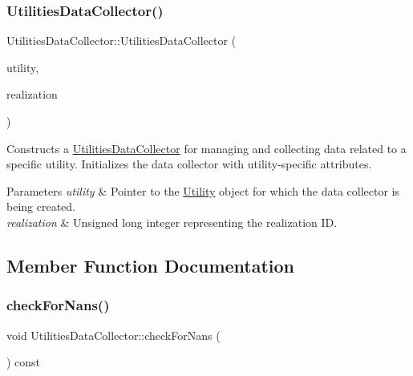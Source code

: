 \subsubsection{\texorpdfstring{Utilities\+Data\+Collector()}{UtilitiesDataCollector()}}
{\footnotesize\ttfamily Utilities\+Data\+Collector\+::\+Utilities\+Data\+Collector (\begin{DoxyParamCaption}\item[{const \mbox{\hyperlink{classUtility}{Utility}} $\ast$}]{utility,  }\item[{unsigned long}]{realization }\end{DoxyParamCaption})\hspace{0.3cm}{\ttfamily [explicit]}}



Constructs a {\ttfamily \mbox{\hyperlink{classUtilitiesDataCollector}{Utilities\+Data\+Collector}}} for managing and collecting data related to a specific utility. Initializes the data collector with utility-\/specific attributes. 


\begin{DoxyParams}{Parameters}
{\em utility} & Pointer to the {\ttfamily \mbox{\hyperlink{classUtility}{Utility}}} object for which the data collector is being created. \\
\hline
{\em realization} & Unsigned long integer representing the realization ID. \\
\hline
\end{DoxyParams}


\subsection{Member Function Documentation}
\mbox{\label{classUtilitiesDataCollector_af01392bbfae02a1fd9ee65b3c97a73a3}} 
\subsubsection{\texorpdfstring{check\+For\+Nans()}{checkForNans()}}
{\footnotesize\ttfamily void Utilities\+Data\+Collector\+::check\+For\+Nans (\begin{DoxyParamCaption}{ }\end{DoxyParamCaption}) const}



